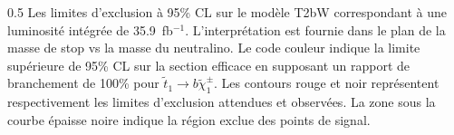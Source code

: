 

                 {0.5}       %
                 { Les limites d'exclusion à 95\% CL sur le modèle T2bW correspondant à une luminosité intégrée de 35.9~fb$^{-1}$. L'interprétation est fournie dans le plan de la masse de stop vs la masse du neutralino. Le code couleur indique la limite supérieure de 95\% CL sur la section efficace en supposant un rapport de branchement de 100\% pour $ \tilde{t}_{1} \to b  \tilde{\chi}^{\pm}_{1} $.  Les contours rouge et noir représentent respectivement les limites d'exclusion attendues et observées. La zone sous la courbe épaisse noire indique la région exclue des points de signal. }


